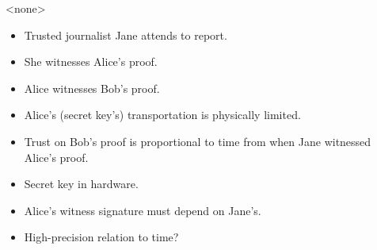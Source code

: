 \mode<none>{%
\begin{frame}
  \begin{idea}
    \begin{itemize}
      \item Trusted journalist Jane attends to report.
      \item She witnesses Alice's proof.

        \pause{}

      \item Alice witnesses Bob's proof.
      \item Alice's (secret key's) transportation is physically limited.
      \item Trust on Bob's proof is proportional to time from when Jane 
        witnessed Alice's proof.
    \end{itemize}
  \end{idea}
\end{frame}

\begin{frame}
  \begin{figure}
    \centering
  \end{figure}

  \begin{remark}
    \begin{itemize}
      \item Secret key in hardware.
      \item Alice's witness signature must depend on Jane's.
      \item High-precision relation to time?
    \end{itemize}
  \end{remark}
\end{frame}
}

